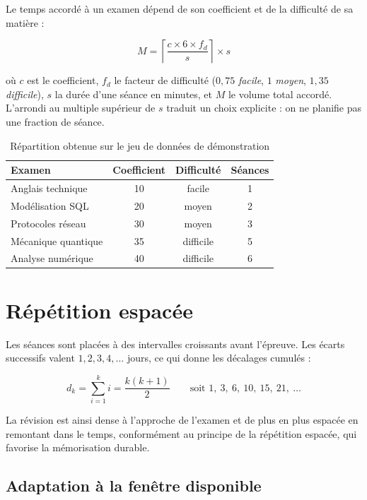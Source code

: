 \documentclass[11pt,a4paper]{report}
\begin{document}
Le temps accordé à un examen dépend de son coefficient et de la difficulté de sa
matière :

\begin{equation}
  M = \left\lceil \frac{c \times 6 \times f_d}{s} \right\rceil \times s
\end{equation}

où $c$ est le coefficient, $f_d$ le facteur de difficulté
($0{,}75$ \emph{facile}, $1$ \emph{moyen}, $1{,}35$ \emph{difficile}), $s$ la durée
d'une séance en minutes, et $M$ le volume total accordé. L'arrondi au multiple
supérieur de $s$ traduit un choix explicite : on ne planifie pas une fraction de
séance.

\begin{table}[h]
\centering
\begin{tabular}{@{}lccc@{}}
\toprule
\textbf{Examen} & \textbf{Coefficient} & \textbf{Difficulté} & \textbf{Séances} \\
\midrule
Anglais technique    & 10 & facile    & 1 \\
Modélisation SQL     & 20 & moyen     & 2 \\
Protocoles réseau    & 30 & moyen     & 3 \\
Mécanique quantique  & 35 & difficile & 5 \\
Analyse numérique    & 40 & difficile & 6 \\
\bottomrule
\end{tabular}
\caption{Répartition obtenue sur le jeu de données de démonstration}
\end{table}

\section{Répétition espacée}

Les séances sont placées à des intervalles croissants avant l'épreuve. Les écarts
successifs valent $1, 2, 3, 4, \ldots$ jours, ce qui donne les décalages cumulés :

\begin{equation}
  d_k = \sum_{i=1}^{k} i = \frac{k(k+1)}{2}
  \qquad \text{soit } 1,\ 3,\ 6,\ 10,\ 15,\ 21,\ \ldots
\end{equation}

La révision est ainsi dense à l'approche de l'examen et de plus en plus espacée en
remontant dans le temps, conformément au principe de la répétition espacée, qui
favorise la mémorisation durable.

\subsection{Adaptation à la fenêtre disponible}
\end{document}
